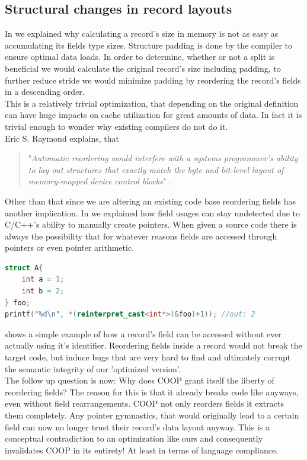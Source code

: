 \subsection{Structural changes in record layouts}\label{scirl}
In  we explained why calculating a record's size in memory is not as easy as accumulating its fields type sizes. Structure padding is done by the compiler to ensure optimal data loads. In order to determine, whether or not a split is beneficial we would calculate the original record's size including padding, to further reduce stride we would minimize padding by reordering the record's fields in a descending order.\\
This is a relatively trivial optimization, that depending on the original definition can have huge impacts on cache utilization for great amounts of data. In fact it is trivial enough to wonder why existing compilers do not do it.\\
Eric S. Raymond explains, that
\begin{quote}
	"\textit{Automatic reordering would interfere with a systems programmer’s ability to lay out structures that exactly match the byte and bit-level layout of memory-mapped device control blocks}" .
\end{quote}
Other than that since we are altering an existing code base reordering fields has another implication. In  we explained how field usages can stay undetected due to C/C++'s ability to manually create pointers. When given a source code there is always the possibility that for whatever reasons fields are accessed through pointers or even pointer arithmetic.
\begin{lstlisting}[language=C++, name={Simple example of why automated field rearrangements can not be considered legal.}, label={pointer_arithmetic_access}]
struct A{
	int a = 1;
	int b = 2;
} foo;
printf("%d\n", *(reinterpret_cast<int*>(&foo)+1)); //out: 2
\end{lstlisting}
 shows a simple example of how a record's field can be accessed without ever actually using it's identifier. Reordering fields inside a record would not break the target code, but induce bugs that are very hard to find and ultimately corrupt the semantic integrity of our 'optimized version'.\\
The follow up question is now: Why does COOP grant itself the liberty of reordering fields? The reason for this is that it already breaks code like  anyways, even without field rearrangements. COOP not only reorders fields it extracts them completely. Any pointer gymnastics, that would originally lead to a certain field can now no longer trust their record's data layout anyway. This is a conceptual contradiction to an optimization like ours and consequently invalidates COOP in its entirety! At least in terms of language compliance.\\\\
